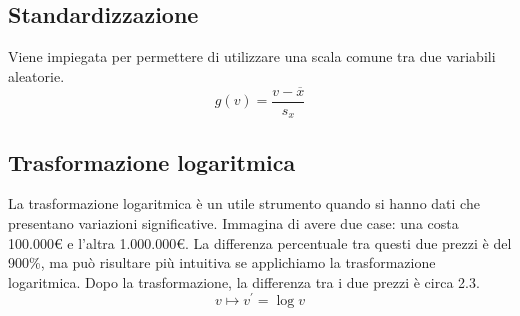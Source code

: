 \documentclass[11pt]{report}
\begin{document}
\subsection{Standardizzazione}
Viene impiegata per permettere di utilizzare una scala comune tra due variabili aleatorie.
\begin{equation}
    g(v) = \frac{v - \overline{x}}{s_x}
\end{equation}
\subsection{Trasformazione logaritmica}
La trasformazione logaritmica è un utile strumento quando si hanno dati che presentano variazioni significative. Immagina di avere due case: una costa 100.000€ e l'altra 1.000.000€. La differenza percentuale tra questi due prezzi è del 900\%, ma può risultare più intuitiva se applichiamo la trasformazione logaritmica. Dopo la trasformazione, la differenza tra i due prezzi è circa 2.3.
\begin{equation}
    v \mapsto v^{\prime} = \log v
\end{equation}
\end{document}
